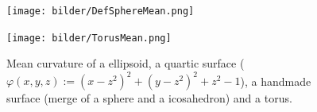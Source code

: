 \documentclass[a2paper]{scrartcl}
\begin{document}
\begin{figure}[h!]
\begin{minipage}[t]{0.24\textwidth}
    \end{minipage}\hfill
    \begin{minipage}[t]{0.24\textwidth}
       \centering\texttt{[image: bilder/DefSphereMean.png]}
    \end{minipage}\hfill
    \begin{minipage}[t]{0.24\textwidth}
       \centering\texttt{[image: bilder/TorusMean.png]}
    \end{minipage}
    \caption[Fehlerplot (Krümmungen auf Sphäre)]
            {Mean curvature of a ellipsoid, a quartic surface (\( \varphi(x,y,z) :=  (x-z^{2})^{2} + (y-z^{2})^{2} + z^{2} - 1 \)),
             a handmade surface (merge of a sphere and a icosahedron) and a torus.}
\end{figure}


\pagebreak
\nocite{flanders}\nocite{hirani}\nocite{heine}

{}
\end{document}
